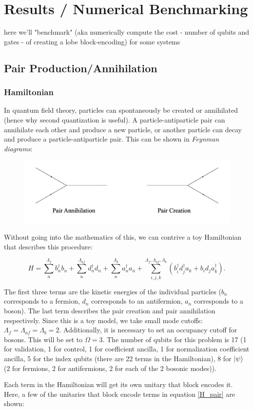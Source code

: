 \section{Results / Numerical Benchmarking}
\label{sec:results}

here we'll "benchmark" (aka numerically compute the cost - number of qubits and gates - of creating a lobe block-encoding) for some systems

%
%
%

\subsection{Pair Production/Annihilation}
\subsubsection{Hamiltonian}
In quantum field theory, particles can spontaneously be created or annihilated (hence why second quantization is useful). A particle-antiparticle pair can annihilate each other and produce a new particle, or another particle can decay and produce a particle-antiparticle pair. This can be shown in \emph{Feynman diagrams}:

\begin{figure}[h]
    \includegraphics[width = 0.7\linewidth]{figures/creation_annihilate.png}
\end{figure}


Without going into the mathematics of this, we can contrive a toy Hamiltonian that describes this procedure:

\begin{equation}
    \label{H_pair}
    H = \sum_n^{\Lambda_{f}} b_n^\dagger b_n + \sum_n^{\Lambda_{af}} d_n^\dagger d_n + \sum_n^{\Lambda_{b}} a_n^\dagger a_n + \sum_{i,j,k}^{\Lambda_f, \Lambda_{af}, \Lambda_b} \left(b_i^\dagger d_j^\dagger a_k + b_i d_j a_k^\dagger \right).
\end{equation}

The first three terms are the kinetic energies of the individual particles ($b_n$ corresponds to a fermion, $d_n$ corresponds to an antifermion, $a_n$ corresponds to a boson). The last term describes the pair creation and pair annihilation respectively. 
Since this is a toy model, we take small mode cutoffs: $\Lambda_f = \Lambda_{af} = \Lambda_b = 2$. Additionally, it is necessary to set an occupancy cutoff for bosons. This will be set to $\Omega = 3$. The number of qubits for this problem is 17 (1 for validation, 1 for control, 1 for coefficient ancilla, 1 for normalization coefficient ancilla, 5 for the index qubits (there are 22 terms in the Hamiltonian), 8 for $\ket{\psi}$ (2 for fermions, 2 for antifermions, 2 for each of the 2 bosonic modes)).

Each term in the Hamiltonian will get its own unitary that block encodes it. Here, a few of the unitaries that block encode terms in equation \ref{H_pair} are shown: